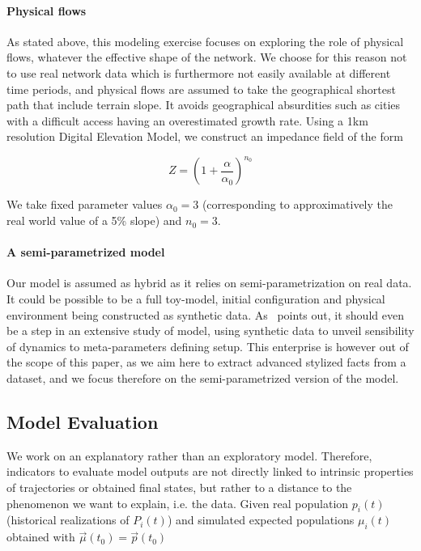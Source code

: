 \documentclass[Royal,sageh,times]{sagej}
\begin{document}
\paragraph{Physical flows}

As stated above, this modeling exercise focuses on exploring the role of physical flows, whatever the effective shape of the network. We choose for this reason not to use real network data which is furthermore not easily available at different time periods, and physical flows are assumed to take the geographical shortest path that include terrain slope. It avoids geographical absurdities such as cities with a difficult access having an overestimated growth rate. Using a 1km resolution Digital Elevation Model, we construct an impedance field of the form

\[
Z = \left(1 + \frac{\alpha}{\alpha_0}\right)^{n_0}
\]

We take fixed parameter values $\alpha_0 = 3$ (corresponding to approximatively the real world value of a 5\% slope) and $n_0 = 3$. 



\paragraph{A semi-parametrized model}

Our model is assumed as hybrid as it relies on semi-parametrization on real data. It could be possible to be a full toy-model, initial configuration and physical environment being constructed as synthetic data. As~\cite{raimbault2016generation} points out, it should even be a step in an extensive study of model, using synthetic data to unveil sensibility of dynamics to meta-parameters defining setup. This enterprise is however out of the scope of this paper, as we aim here to extract advanced stylized facts from a dataset, and we focus therefore on the semi-parametrized version of the model.



\subsection*{Model Evaluation}

We work on an explanatory rather than an exploratory model. Therefore, indicators to evaluate model outputs are not directly linked to intrinsic properties of trajectories or obtained final states, but rather to a distance to the phenomenon we want to explain, i.e. the data. Given real population $p_i(t)$ (historical realizations of $P_i(t)$) and simulated expected populations $\mu_i(t)$ obtained with $\vec{\mu}(t_0) = \vec{p}(t_0)$
\end{document}
